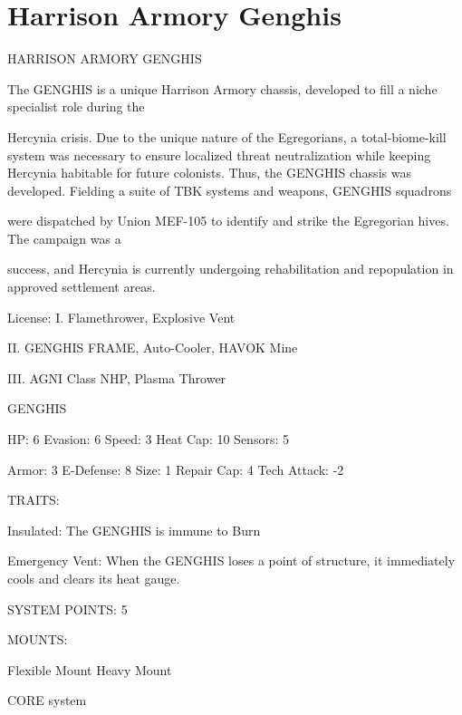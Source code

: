 \section{Harrison Armory Genghis}

                                  HARRISON ARMORY GENGHIS

The GENGHIS is a unique Harrison Armory chassis, developed to fill a niche specialist role during the

Hercynia crisis. Due to the unique nature of the Egregorians, a total-biome-kill system was necessary to
ensure localized threat neutralization while keeping Hercynia habitable for future colonists. Thus, the
GENGHIS chassis was developed. Fielding a suite of TBK systems and weapons, GENGHIS squadrons

were dispatched by Union MEF-105 to identify and strike the Egregorian hives. The campaign was a

success, and Hercynia is currently undergoing rehabilitation and repopulation in approved settlement areas.

                                                       License:
I. Flamethrower, Explosive Vent

II. GENGHIS FRAME, Auto-Cooler, HAVOK Mine

III. AGNI Class NHP, Plasma Thrower





                                                GENGHIS

HP: 6          Evasion: 6                            Speed: 3            Heat Cap: 10       Sensors: 5

Armor: 3       E-Defense: 8                          Size: 1             Repair Cap: 4      Tech Attack: -2

                                                  TRAITS:

Insulated: The GENGHIS is immune to Burn

Emergency Vent: When the GENGHIS loses a point of structure, it immediately cools and clears its
heat gauge.

                                            SYSTEM POINTS: 5

                                                 MOUNTS:

Flexible Mount                                        Heavy Mount

                                               CORE system

